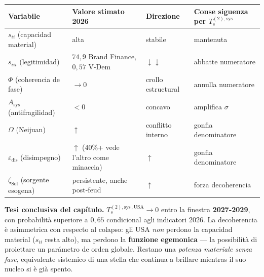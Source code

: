 {\def\LTcaptype{none} %
{\small\begin{longtable}[]{@{}
  >{\raggedright\arraybackslash}p{}
  >{\raggedright\arraybackslash}p{}
  >{\raggedright\arraybackslash}p{}
  >{\raggedright\arraybackslash}p{}@{}}
\toprule\noalign{}
\begin{minipage}[b]{\linewidth}\raggedright
Variabile
\end{minipage} & \begin{minipage}[b]{\linewidth}\raggedright
Valore stimato 2026
\end{minipage} & \begin{minipage}[b]{\linewidth}\raggedright
Direzione
\end{minipage} & \begin{minipage}[b]{\linewidth}\raggedright
Conse siguenza per \(T_s^{(2),\text{sys}}\)
\end{minipage} \\
\midrule\noalign{}
\endhead
\bottomrule\noalign{}
\endlastfoot
\(s_{ii}\) (capacidad material) & alta & stabile & mantenuta \\
\(s_{iii}\) (legitimidad) & \(74{,}9\) Brand Finance, \(0{,}57\) V-Dem &
\(\downarrow\downarrow\) & abbatte numeratore \\
\(\Phi\) (coherencia de fase) & \(\to 0\) & crollo estructural & annulla
numeratore \\
\(A_{\text{sys}}\) (antifragilidad) & \(< 0\) & concavo & amplifica
\(\sigma\) \\
\(\Omega\) (Neijuan) & \(\uparrow\) & conflitto interno & gonfia
denominatore \\
\(\varepsilon_{\text{dis}}\) (disimpegno) & \(\uparrow\) (40\%+ vede
l'altro come minaccia) & \(\uparrow\) & gonfia denominatore \\
\(\zeta_{\text{Sol}}\) (sorgente esogena) & persistente, anche post-feud
& \(\uparrow\) & forza decoherencia \\
\end{longtable}}
}

\Hypoth{} \textbf{Tesi conclusiva del capítulo.}
\(T_s^{(2),\text{sys}\,,\text{USA}} \to 0\) entro la finestra
\textbf{2027-2029}, con probabilità superiore a \(0{,}65\) condicional
agli indicatori 2026. La decoherencia è asimmetrica con respecto al colapso:
gli USA \emph{non} perdono la capacidad material (\(s_{ii}\) resta
alto), ma perdono la \textbf{funzione egemonica} --- la possibilità di
proiettare un parámetro de orden globale. Restano una \emph{potenza
materiale senza fase}, equivalente sistemico di una stella che continua
a brillare mientras il suo nucleo si è già spento.



